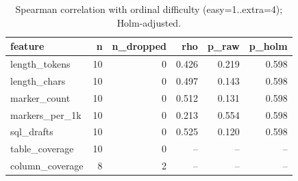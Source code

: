 \begin{table}[htbp]
\caption{Spearman correlation with ordinal difficulty (easy=1..extra=4); Holm-adjusted.}
\label{tab:task2_spearman}
\begin{tabular}{lrrrrr}
\toprule
feature & n & n\_dropped & rho & p\_raw & p\_holm \\
\midrule
length_tokens & 10 & 0 & 0.426 & 0.219 & 0.598 \\
length_chars & 10 & 0 & 0.497 & 0.143 & 0.598 \\
marker_count & 10 & 0 & 0.512 & 0.131 & 0.598 \\
markers_per_1k & 10 & 0 & 0.213 & 0.554 & 0.598 \\
sql_drafts & 10 & 0 & 0.525 & 0.120 & 0.598 \\
table_coverage & 10 & 0 & -- & -- & -- \\
column_coverage & 8 & 2 & -- & -- & -- \\
\bottomrule
\end{tabular}
\end{table}
